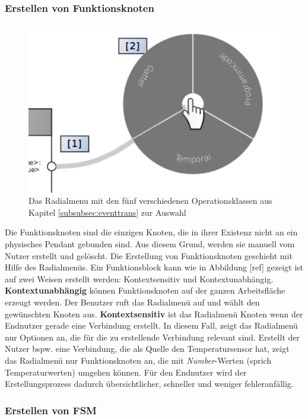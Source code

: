 \subsubsection{Erstellen von Funktionsknoten}

\begin{figure}[h]
  \centering
  \includegraphics[width=.6\textwidth]{bilder/chapter4/chapter4_3/createNodes.pdf}
  \caption{Das Radialmenu mit den fünf verschiedenen Operationsklassen aus Kapitel \ref{subsubsec:eventtrans} zur Auswahl}
  \label{fig:connectNodesInteraction}
\end{figure}
Die Funktionsknoten sind die einzigen Knoten, die in ihrer Existenz nicht an ein physisches Pendant gebunden sind. Aus diesem Grund, werden sie manuell vom Nutzer erstellt und gelöscht. Die Erstellung von Funktionsknoten geschieht mit Hilfe des Radialmenüs. Ein Funktionsblock kann wie in Abbildung [ref] gezeigt ist auf zwei Weisen erstellt werden: Kontextsensitiv und Kontextunabhängig. \textbf{Kontextunabhängig} können Funktionsknoten auf der ganzen Arbeitsfläche erzeugt werden. Der Benutzer ruft das Radialmenü auf und wählt den gewünschten Knoten aus. \textbf{Kontextsensitiv} ist das Radialmenü Knoten wenn der Endnutzer gerade eine Verbindung erstellt. In diesem Fall, zeigt das Radialmenü nur Optionen an, die für die zu erstellende Verbindung relevant sind. Erstellt der Nutzer bspw. eine Verbindung, die als Quelle den Temperatursensor hat, zeigt das Radialmenü nur Funktionsknoten an, die mit \textit{Number}-Werten (sprich Temperaturwerten) umgehen können. Für den Endnutzer wird der Erstellungsprozess dadurch übersichtlicher, schneller und weniger fehleranfällig.

\subsubsection{Erstellen von \ac{FSM}}\label{FSMkreieren}


